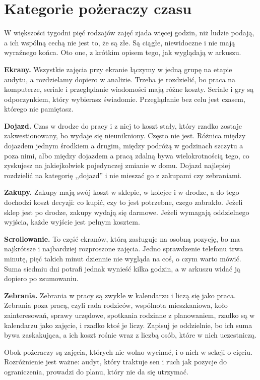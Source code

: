 \section{Kategorie pożeraczy czasu}

W większości tygodni pięć rodzajów zajęć zjada więcej godzin, niż ludzie podają, a ich wspólną cechą nie jest to, że są złe. Są ciągłe, niewidoczne i nie mają wyraźnego końca. Oto one, z krótkim opisem tego, jak wyglądają w arkuszu.

\textbf{Ekrany.} Wszystkie zajęcia przy ekranie łączymy w jedną grupę na etapie audytu, a rozdzielamy dopiero w analizie. Trzeba je rozdzielić, bo praca na komputerze, seriale i przeglądanie wiadomości mają różne koszty. Seriale i gry są odpoczynkiem, który wybierasz świadomie. Przeglądanie bez celu jest czasem, którego nie pamiętasz.

\textbf{Dojazd.} Czas w drodze do pracy i z niej to koszt stały, który rzadko zostaje zakwestionowany, bo wydaje się nieunikniony. Często nie jest. Różnica między dojazdem jednym środkiem a drugim, między podróżą w godzinach szczytu a poza nimi, albo między dojazdem a pracą zdalną bywa wielokrotnością tego, co zyskujesz na jakiejkolwiek pojedynczej zmianie w domu. Dojazd najlepiej rozdzielić na kategorię ,,dojazd'' i nie mieszać go z zakupami czy zebraniami.

\textbf{Zakupy.} Zakupy mają swój koszt w sklepie, w kolejce i w drodze, a do tego dochodzi koszt decyzji: co kupić, czy to jest potrzebne, czego zabrakło. Jeżeli sklep jest po drodze, zakupy wydają się darmowe. Jeżeli wymagają oddzielnego wyjścia, każde wyjście jest pełnym kosztem.

\textbf{Scrollowanie.} To część ekranów, którą zasługuje na osobną pozycję, bo ma najkrótsze i najbardziej rozproszone zajęcia. Jedno sprawdzenie telefonu trwa minutę, pięć takich minut dziennie nie wygląda na coś, o czym warto mówić. Suma siedmiu dni potrafi jednak wynieść kilka godzin, a w arkuszu widać ją dopiero po zsumowaniu.

\textbf{Zebrania.} Zebrania w pracy są zwykle w kalendarzu i liczą się jako praca. Zebrania poza pracą, czyli rada rodziców, wspólnota mieszkaniowa, koło zainteresowań, sprawy urzędowe, spotkania rodzinne z planowaniem, rzadko są w kalendarzu jako zajęcie, i rzadko ktoś je liczy. Zapisuj je oddzielnie, bo ich suma bywa zaskakująca, a ich koszt rośnie wraz z liczbą osób, które w nich uczestniczą.

Obok pożeraczy są zajęcia, których nie wolno wycinać, i o nich w sekcji o cięciu. Rozróżnienie jest ważne: audyt, który traktuje sen i ruch jak pozycje do ograniczenia, prowadzi do planu, który nie da się utrzymać.


